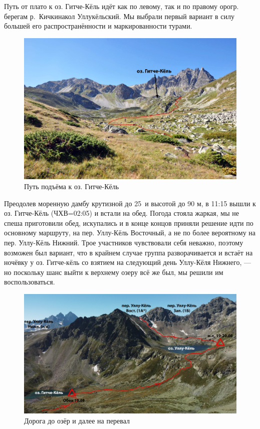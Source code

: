 Путь от плато к оз. Гитче-Кёль идёт как по левому, так и по правому орогр. берегам р.~Кичкинакол Уллукёльский. Мы выбрали первый вариант в силу большей его распространённости и маркированности турами. 

\begin{figure}[h!]
	\centering
	\includegraphics[width=0.7\linewidth]{../pics/DSC_0718}
	\caption{Путь подъёма к оз. Гитче-Кёль}
	\label{fig:DSC_0718}
\end{figure}

Преодолев моренную дамбу крутизной до 25\degree~и высотой до 90 м, в 11:15 вышли к оз. Гитче-Кёль (ЧХВ=02:05) и встали на обед. 
Погода стояла жаркая, мы не спеша приготовили обед, искупались и в конце концов приняли решение идти по основному маршруту, на пер. Уллу-Кёль Восточный, а не по более вероятному на пер. Уллу-Кёль Нижний. Трое участников чувствовали себя неважно, поэтому возможен был вариант, что в крайнем случае группа разворачивается и встаёт на ночёвку у оз. Гитче-кёль со взятием на следующий день Уллу-Кёля Нижнего, — но поскольку шанс выйти к верхнему озеру всё же был, мы решили им воспользоваться.

\begin{figure}[h!]
	\centering
	\includegraphics[width=0.7\linewidth]{../pics/ullu_kuel_route}
	\caption{Дорога до озёр и далее на перевал}
	\label{fig:ullu_kuel_route}
\end{figure}

